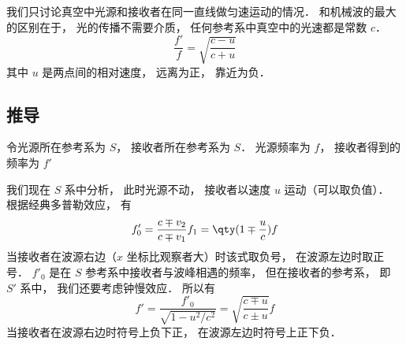 

我们只讨论真空中光源和接收者在同一直线做匀速运动的情况． 和机械波的最大的区别在于， 光的传播不需要介质， 任何参考系中真空中的光速都是常数 $c$． %
\begin{equation}
\frac{f'}{f} = \sqrt{\frac{c - u}{c + u}}
\end{equation}
其中 $u$ 是两点间的相对速度， 远离为正， 靠近为负．

\subsection{推导}
令光源所在参考系为 $S$， 接收者所在参考系为 $S$． 光源频率为 $f$， 接收者得到的频率为 $f'$

我们现在 $S$ 系中分析， 此时光源不动， 接收者以速度 $u$ 运动（可以取负值）． 根据经典多普勒效应， 有
\begin{equation}
f'_0 = \frac{c \mp v_2}{c \mp v_1}f_1 = \qty(1 \mp \frac{u}{c})f
\end{equation}
当接收者在波源右边（$x$ 坐标比观察者大）时该式取负号， 在波源左边时取正号． $f'_0$ 是在 $S$ 参考系中接收者与波峰相遇的频率， 但在接收者的参考系， 即 $S'$ 系中， 我们还要考虑钟慢效应． 所以有
\begin{equation}
f' = \frac{f'_0}{\sqrt{1 - u^2/c^2}} = \sqrt{\frac{c \mp u}{c \pm u}} f
\end{equation}
当接收者在波源右边时符号上负下正， 在波源左边时符号上正下负．
